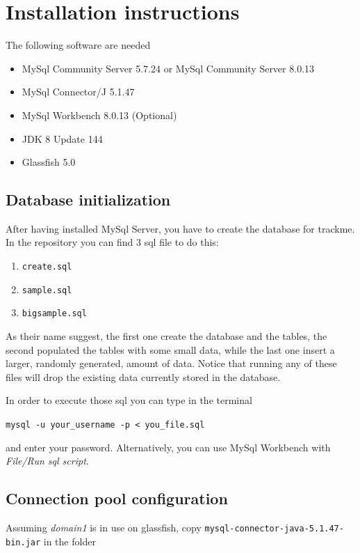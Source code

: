 \section{Installation instructions}
The following software are needed

\begin{itemize}
\item MySql Community Server  5.7.24 or MySql Community Server 8.0.13
\item MySql Connector/J 5.1.47
\item MySql Workbench 8.0.13 (Optional)
\item JDK 8 Update 144
\item Glassfish 5.0
\end{itemize}




\subsection{Database initialization}
After having installed MySql Server, you have to create the database for trackme.
In the repository you can find 3 sql file to do this:

\begin{enumerate}
\item \texttt{create.sql}
\item \texttt{sample.sql}
\item \texttt{bigsample.sql}
\end{enumerate}
As their name suggest, the first one create the database and the tables, the second populated the tables with some small data, while the last one insert a larger, randomly generated, amount of data.
Notice that running any of these files will drop the existing data currently stored in the database.
\vspace{1em}

\noindent 
In order to execute those sql you can type in the terminal

\begin{center}
\texttt{mysql -u your\_username -p \textless\ you\_file.sql}
\end{center}
and enter your password.
Alternatively, you can use MySql Workbench with \textit{File/Run sql script}.


\subsection{Connection pool configuration}
Assuming \textit{domain1} is in use on glassfish, copy \texttt{mysql-connector-java-5.1.47-bin.jar} in the folder

